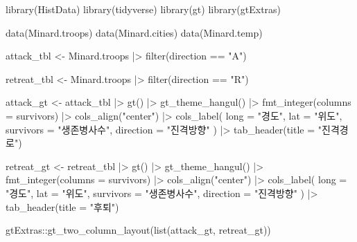 \documentclass[
  letterpaper,
  chapter,a4paper,showtrims,openright,hidelinks]{oblivoir}
\newenvironment{Shaded}{\begin{snugshade}}{\end{snugshade}}
\newcommand{\AttributeTok}[1]{\textcolor[rgb]{0.40,0.45,0.13}{#1}}
\newcommand{\FunctionTok}[1]{\textcolor[rgb]{0.28,0.35,0.67}{#1}}
\newcommand{\NormalTok}[1]{\textcolor[rgb]{0.00,0.23,0.31}{#1}}
\newcommand{\OtherTok}[1]{\textcolor[rgb]{0.00,0.23,0.31}{#1}}
\newcommand{\SpecialCharTok}[1]{\textcolor[rgb]{0.37,0.37,0.37}{#1}}
\newcommand{\StringTok}[1]{\textcolor[rgb]{0.13,0.47,0.30}{#1}}
\begin{document}
\begin{Shaded}
\begin{Highlighting}[]
\FunctionTok{library}\NormalTok{(HistData)}
\FunctionTok{library}\NormalTok{(tidyverse)}
\FunctionTok{library}\NormalTok{(gt)}
\FunctionTok{library}\NormalTok{(gtExtras)}

\FunctionTok{data}\NormalTok{(Minard.troops) }
\FunctionTok{data}\NormalTok{(Minard.cities)}
\FunctionTok{data}\NormalTok{(Minard.temp)}

\NormalTok{attack\_tbl }\OtherTok{\textless{}{-}}\NormalTok{ Minard.troops }\SpecialCharTok{|\textgreater{}} 
  \FunctionTok{filter}\NormalTok{(direction }\SpecialCharTok{==} \StringTok{"A"}\NormalTok{)}

\NormalTok{retreat\_tbl }\OtherTok{\textless{}{-}}\NormalTok{ Minard.troops }\SpecialCharTok{|\textgreater{}} 
  \FunctionTok{filter}\NormalTok{(direction }\SpecialCharTok{==} \StringTok{"R"}\NormalTok{)}

\NormalTok{attack\_gt }\OtherTok{\textless{}{-}}\NormalTok{ attack\_tbl }\SpecialCharTok{|\textgreater{}} 
  \FunctionTok{gt}\NormalTok{() }\SpecialCharTok{|\textgreater{}} 
    \FunctionTok{gt\_theme\_hangul}\NormalTok{() }\SpecialCharTok{|\textgreater{}} 
    \FunctionTok{fmt\_integer}\NormalTok{(}\AttributeTok{columns =}\NormalTok{ survivors) }\SpecialCharTok{|\textgreater{}} 
    \FunctionTok{cols\_align}\NormalTok{(}\StringTok{"center"}\NormalTok{) }\SpecialCharTok{|\textgreater{}} 
    \FunctionTok{cols\_label}\NormalTok{(}
      \AttributeTok{long =} \StringTok{"경도"}\NormalTok{,}
      \AttributeTok{lat =} \StringTok{"위도"}\NormalTok{,}
      \AttributeTok{survivors =}  \StringTok{"생존병사수"}\NormalTok{,}
      \AttributeTok{direction =} \StringTok{"진격방향"}
\NormalTok{    ) }\SpecialCharTok{|\textgreater{}} 
    \FunctionTok{tab\_header}\NormalTok{(}\AttributeTok{title =} \StringTok{"진격경로"}\NormalTok{)}

\NormalTok{retreat\_gt }\OtherTok{\textless{}{-}}\NormalTok{ retreat\_tbl }\SpecialCharTok{|\textgreater{}} 
  \FunctionTok{gt}\NormalTok{() }\SpecialCharTok{|\textgreater{}} 
    \FunctionTok{gt\_theme\_hangul}\NormalTok{() }\SpecialCharTok{|\textgreater{}} 
    \FunctionTok{fmt\_integer}\NormalTok{(}\AttributeTok{columns =}\NormalTok{ survivors) }\SpecialCharTok{|\textgreater{}} 
    \FunctionTok{cols\_align}\NormalTok{(}\StringTok{"center"}\NormalTok{) }\SpecialCharTok{|\textgreater{}} 
    \FunctionTok{cols\_label}\NormalTok{(}
      \AttributeTok{long =} \StringTok{"경도"}\NormalTok{,}
      \AttributeTok{lat =} \StringTok{"위도"}\NormalTok{,}
      \AttributeTok{survivors =}  \StringTok{"생존병사수"}\NormalTok{,}
      \AttributeTok{direction =} \StringTok{"진격방향"}
\NormalTok{    )  }\SpecialCharTok{|\textgreater{}} 
    \FunctionTok{tab\_header}\NormalTok{(}\AttributeTok{title =} \StringTok{"후퇴"}\NormalTok{)}

\NormalTok{gtExtras}\SpecialCharTok{::}\FunctionTok{gt\_two\_column\_layout}\NormalTok{(}\FunctionTok{list}\NormalTok{(attack\_gt, retreat\_gt))}
\end{Highlighting}
\end{Shaded}
\end{document}
